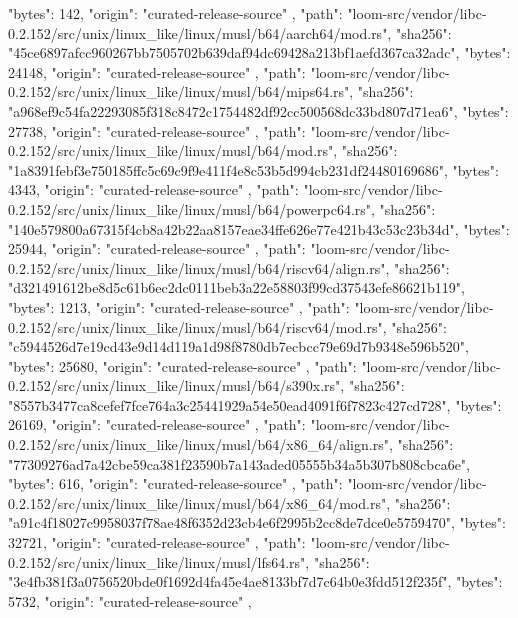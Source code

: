 {{      "bytes": 142,
      "origin": "curated-release-source"
    },
    {
      "path": "loom-src/vendor/libc-0.2.152/src/unix/linux_like/linux/musl/b64/aarch64/mod.rs",
      "sha256": "45ce6897afcc960267bb7505702b639daf94dc69428a213bf1aefd367ca32adc",
      "bytes": 24148,
      "origin": "curated-release-source"
    },
    {
      "path": "loom-src/vendor/libc-0.2.152/src/unix/linux_like/linux/musl/b64/mips64.rs",
      "sha256": "a968ef9c54fa22293085f318c8472c1754482df92cc500568dc33bd807d71ea6",
      "bytes": 27738,
      "origin": "curated-release-source"
    },
    {
      "path": "loom-src/vendor/libc-0.2.152/src/unix/linux_like/linux/musl/b64/mod.rs",
      "sha256": "1a8391febf3e750185ffc5c69c9f9e411f4e8c53b5d994cb231df24480169686",
      "bytes": 4343,
      "origin": "curated-release-source"
    },
    {
      "path": "loom-src/vendor/libc-0.2.152/src/unix/linux_like/linux/musl/b64/powerpc64.rs",
      "sha256": "140e579800a67315f4cb8a42b22aa8157eae34ffe626e77e421b43c53c23b34d",
      "bytes": 25944,
      "origin": "curated-release-source"
    },
    {
      "path": "loom-src/vendor/libc-0.2.152/src/unix/linux_like/linux/musl/b64/riscv64/align.rs",
      "sha256": "d321491612be8d5c61b6ec2dc0111beb3a22e58803f99cd37543efe86621b119",
      "bytes": 1213,
      "origin": "curated-release-source"
    },
    {
      "path": "loom-src/vendor/libc-0.2.152/src/unix/linux_like/linux/musl/b64/riscv64/mod.rs",
      "sha256": "c5944526d7e19cd43e9d14d119a1d98f8780db7ecbcc79e69d7b9348e596b520",
      "bytes": 25680,
      "origin": "curated-release-source"
    },
    {
      "path": "loom-src/vendor/libc-0.2.152/src/unix/linux_like/linux/musl/b64/s390x.rs",
      "sha256": "8557b3477ca8cefef7fce764a3c25441929a54e50ead4091f6f7823c427cd728",
      "bytes": 26169,
      "origin": "curated-release-source"
    },
    {
      "path": "loom-src/vendor/libc-0.2.152/src/unix/linux_like/linux/musl/b64/x86_64/align.rs",
      "sha256": "77309276ad7a42cbe59ca381f23590b7a143aded05555b34a5b307b808cbca6e",
      "bytes": 616,
      "origin": "curated-release-source"
    },
    {
      "path": "loom-src/vendor/libc-0.2.152/src/unix/linux_like/linux/musl/b64/x86_64/mod.rs",
      "sha256": "a91c4f18027c9958037f78ae48f6352d23cb4e6f2995b2cc8de7dce0e5759470",
      "bytes": 32721,
      "origin": "curated-release-source"
    },
    {
      "path": "loom-src/vendor/libc-0.2.152/src/unix/linux_like/linux/musl/lfs64.rs",
      "sha256": "3e4fb381f3a0756520bde0f1692d4fa45e4ae8133bf7d7c64b0e3fdd512f235f",
      "bytes": 5732,
      "origin": "curated-release-source"
    },
    {
}}
